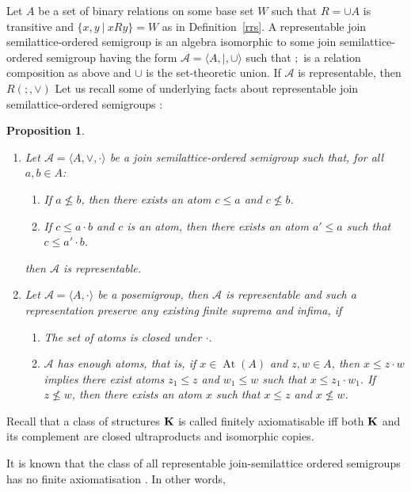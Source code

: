 \documentclass[a4paper]{article}
\theoremstyle{defin}
\theoremstyle{theorem}
\theoremstyle{prop}
\newtheorem{prop}{Proposition}
\theoremstyle{lemma}
\theoremstyle{ex}
\theoremstyle{col}
\begin{document}
Let $A$ be a set of binary relations on some base set $W$ such that $R = \cup A$ is transitive and $\{ x, y \: | \: x R y \} = W$ as in Definition~\ref{rrs}. A representable join semilattice-ordered semigroup is an algebra isomorphic to some join semilattice-ordered semigroup having the form $\mathcal{A} = \langle A, |, \cup \rangle$ such that $;$ is a relation composition as above and $\cup$ is the set-theoretic union. If $\mathcal{A}$ is representable, then $R(;, \vee)$ Let us recall some of underlying facts about representable join semilattice-ordered semigroups \cite{andreka1991representations}:

\begin{prop}
  $ $

  \begin{enumerate}
    \item Let $\mathcal{A} = \langle A, \vee, \cdot \rangle$ be a join semilattice-ordered semigroup such that, for all $a, b \in A$:
    \begin{enumerate}
      \item If $a \nleq b$, then there exists an atom $c \leq a$ and $c \nleq b$.
      \item If $c \leq a \cdot b$ and $c$ is an atom, then there exists an atom $a' \leq a$ such that $c \leq a' \cdot b$.
    \end{enumerate}
    then $\mathcal{A}$ is representable.
    \item Let $\mathcal{A} = \langle A, \cdot \rangle$ be a posemigroup, then $\mathcal{A}$ is representable and such a representation preserve any existing finite suprema and infima, if
    \begin{enumerate}
      \item The set of atoms is closed under $\cdot$.
      \item $\mathcal{A}$ has enough atoms, that is, if $x \in \operatorname{At}(A)$ and $z, w \in A$, then $x \leq z \cdot w$ implies there exist atoms $z_1 \leq z$ and $w_1 \leq w$ such that $x \leq z_1 \cdot w_1$. If $z \nleq w$, then there exists an atom $x$ such that $x \leq z$ and $x \nleq w$.
    \end{enumerate}
  \end{enumerate}
\end{prop}

Recall that a class of structures ${\bf K}$ is called finitely axiomatisable iff both ${\bf K}$ and its complement are closed
ultraproducts and isomorphic copies.

It is known that the class of all representable join-semilattice ordered semigroups has no finite axiomatisation \cite{andreka1989union}. In other words,
\end{document}
